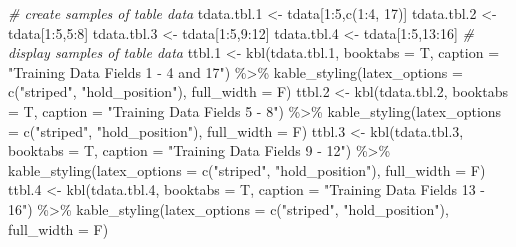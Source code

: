 \documentclass[
]{article}
\newenvironment{Shaded}{\begin{snugshade}}{\end{snugshade}}
\newcommand{\AttributeTok}[1]{\textcolor[rgb]{0.77,0.63,0.00}{#1}}
\newcommand{\CommentTok}[1]{\textcolor[rgb]{0.56,0.35,0.01}{\textit{#1}}}
\newcommand{\DecValTok}[1]{\textcolor[rgb]{0.00,0.00,0.81}{#1}}
\newcommand{\FloatTok}[1]{\textcolor[rgb]{0.00,0.00,0.81}{#1}}
\newcommand{\FunctionTok}[1]{\textcolor[rgb]{0.00,0.00,0.00}{#1}}
\newcommand{\NormalTok}[1]{#1}
\newcommand{\OtherTok}[1]{\textcolor[rgb]{0.56,0.35,0.01}{#1}}
\newcommand{\SpecialCharTok}[1]{\textcolor[rgb]{0.00,0.00,0.00}{#1}}
\newcommand{\StringTok}[1]{\textcolor[rgb]{0.31,0.60,0.02}{#1}}
\begin{document}
\begin{Shaded}
\begin{Highlighting}[]
\CommentTok{\# create samples of table data}
\NormalTok{tdata.tbl}\FloatTok{.1} \OtherTok{\textless{}{-}}\NormalTok{ tdata[}\DecValTok{1}\SpecialCharTok{:}\DecValTok{5}\NormalTok{,}\FunctionTok{c}\NormalTok{(}\DecValTok{1}\SpecialCharTok{:}\DecValTok{4}\NormalTok{, }\DecValTok{17}\NormalTok{)]}
\NormalTok{tdata.tbl}\FloatTok{.2} \OtherTok{\textless{}{-}}\NormalTok{ tdata[}\DecValTok{1}\SpecialCharTok{:}\DecValTok{5}\NormalTok{,}\DecValTok{5}\SpecialCharTok{:}\DecValTok{8}\NormalTok{]}
\NormalTok{tdata.tbl}\FloatTok{.3} \OtherTok{\textless{}{-}}\NormalTok{ tdata[}\DecValTok{1}\SpecialCharTok{:}\DecValTok{5}\NormalTok{,}\DecValTok{9}\SpecialCharTok{:}\DecValTok{12}\NormalTok{]}
\NormalTok{tdata.tbl}\FloatTok{.4} \OtherTok{\textless{}{-}}\NormalTok{ tdata[}\DecValTok{1}\SpecialCharTok{:}\DecValTok{5}\NormalTok{,}\DecValTok{13}\SpecialCharTok{:}\DecValTok{16}\NormalTok{]}
\CommentTok{\# display samples of table data}
\NormalTok{ttbl}\FloatTok{.1} \OtherTok{\textless{}{-}} \FunctionTok{kbl}\NormalTok{(tdata.tbl}\FloatTok{.1}\NormalTok{, }\AttributeTok{booktabs =}\NormalTok{ T, }\AttributeTok{caption =} \StringTok{"Training Data Fields 1 {-} 4 and 17"}\NormalTok{) }\SpecialCharTok{\%\textgreater{}\%}
  \FunctionTok{kable\_styling}\NormalTok{(}\AttributeTok{latex\_options =} \FunctionTok{c}\NormalTok{(}\StringTok{"striped"}\NormalTok{, }\StringTok{"hold\_position"}\NormalTok{),}
  \AttributeTok{full\_width =}\NormalTok{ F) }
\NormalTok{ttbl}\FloatTok{.2} \OtherTok{\textless{}{-}} \FunctionTok{kbl}\NormalTok{(tdata.tbl}\FloatTok{.2}\NormalTok{, }\AttributeTok{booktabs =}\NormalTok{ T, }\AttributeTok{caption =} \StringTok{"Training Data Fields 5 {-} 8"}\NormalTok{) }\SpecialCharTok{\%\textgreater{}\%}
  \FunctionTok{kable\_styling}\NormalTok{(}\AttributeTok{latex\_options =} \FunctionTok{c}\NormalTok{(}\StringTok{"striped"}\NormalTok{, }\StringTok{"hold\_position"}\NormalTok{),}
  \AttributeTok{full\_width =}\NormalTok{ F) }
\NormalTok{ttbl}\FloatTok{.3} \OtherTok{\textless{}{-}} \FunctionTok{kbl}\NormalTok{(tdata.tbl}\FloatTok{.3}\NormalTok{, }\AttributeTok{booktabs =}\NormalTok{ T, }\AttributeTok{caption =} \StringTok{"Training Data Fields 9 {-} 12"}\NormalTok{) }\SpecialCharTok{\%\textgreater{}\%}
  \FunctionTok{kable\_styling}\NormalTok{(}\AttributeTok{latex\_options =} \FunctionTok{c}\NormalTok{(}\StringTok{"striped"}\NormalTok{, }\StringTok{"hold\_position"}\NormalTok{),}
  \AttributeTok{full\_width =}\NormalTok{ F) }
\NormalTok{ttbl}\FloatTok{.4} \OtherTok{\textless{}{-}} \FunctionTok{kbl}\NormalTok{(tdata.tbl}\FloatTok{.4}\NormalTok{, }\AttributeTok{booktabs =}\NormalTok{ T, }\AttributeTok{caption =} \StringTok{"Training Data Fields 13 {-} 16"}\NormalTok{) }\SpecialCharTok{\%\textgreater{}\%}
  \FunctionTok{kable\_styling}\NormalTok{(}\AttributeTok{latex\_options =} \FunctionTok{c}\NormalTok{(}\StringTok{"striped"}\NormalTok{, }\StringTok{"hold\_position"}\NormalTok{),}
  \AttributeTok{full\_width =}\NormalTok{ F) }
\end{Highlighting}
\end{Shaded}
\end{document}
